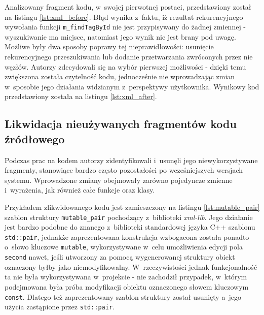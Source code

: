 Analizowany fragment kodu, w~swojej pierwotnej postaci, przedstawiony został na listingu \ref{lst:xml_before}. Błąd wynika z~faktu, iż rezultat rekurencyjnego wywołania funkcji \lstinline{m_findTagById} nie jest przypisywany do żadnej zmiennej - wyszukiwanie ma miejsce, natomiast jego wynik nie jest brany pod uwagę. Możliwe były dwa sposoby poprawy tej nieprawidłowości: usunięcie rekurencyjnego przeszukiwania lub dodanie przetwarzania zwróconych przez nie węzłów. Autorzy zdecydowali się na wybór pierwszej możliwości - dzięki temu zwiększona została czytelność kodu, jednocześnie nie wprowadzając zmian w~sposobie jego działania widzianym z~perspektywy użytkownika. Wynikowy kod przedstawiony została na listingu \ref{lst:xml_after}.






\subsection{Likwidacja nieużywanych fragmentów kodu źródłowego}
Podczas prac na kodem autorzy zidentyfikowali i~usunęli jego niewykorzystywane fragmenty, stanowiące bardzo często pozostałości po wcześniejszych wersjach systemu. Wprowadzone zmiany obejmowały zarówno pojedyncze zmienne i~wyrażenia, jak również całe funkcje oraz klasy. 

Przykładem zlikwidowanego kodu jest zamieszczony na listingu \ref{lst:mutable_pair} szablon struktury \lstinline{mutable_pair} pochodzący z~biblioteki \emph{xml-lib}. Jego działanie jest bardzo podobne do znanego z~biblioteki standardowej języka C++ szablonu \lstinline{std::pair}, jednakże zaprezentowana konstrukcja wzbogacona została ponadto o~słowo kluczowe \lstinline{mutable}, wykorzystywane w~celu umożliwienia edycji pola \lstinline{second} nawet, jeśli utworzony za pomocą wygenerowanej struktury obiekt oznaczony byłby jako niemodyfikowalny. W~rzeczywistości jednak funkcjonalność ta nie była wykorzystywana w~projekcie - nie zachodził przypadek, w~którym podejmowana była próba modyfikacji obiektu oznaczonego słowem kluczowym \lstinline{const}. Dlatego też zaprezentowany szablon struktury został usunięty a~jego użycia zastąpione przez \lstinline{std::pair}.

